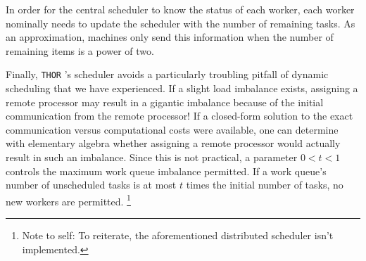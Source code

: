 \documentclass[twoside,leqno,twocolumn]{article}
\newcommand{\THOR}{{{\tt THOR}} }
\newcommand{\authornote}[1]{\footnote{Note to self: #1}}
\newcommand{\authorsnote}[1]{\authornote{#1}}
\begin{document}
In order for the central scheduler to know the status of each worker, each worker nominally needs to update the scheduler with the number of remaining tasks.
As an approximation, machines only send this information when the number of remaining items is a power of two.

Finally, \THOR's scheduler avoids a particularly troubling pitfall of dynamic scheduling that we have experienced.
If a slight load imbalance exists, assigning a remote processor may result in a gigantic imbalance because of the initial communication from the remote processor!
If a closed-form solution to the exact communication versus computational costs were available, one can determine with elementary algebra whether assigning a remote processor would actually result in such an imbalance.
Since this is not practical, a parameter $0 < t < 1$ controls the maximum work queue imbalance permitted.
If a work queue's number of unscheduled tasks is at most $t$ times the initial number of tasks, no new workers are permitted.
\authorsnote{To reiterate, the aforementioned distributed scheduler isn't implemented.}




\end{document}
